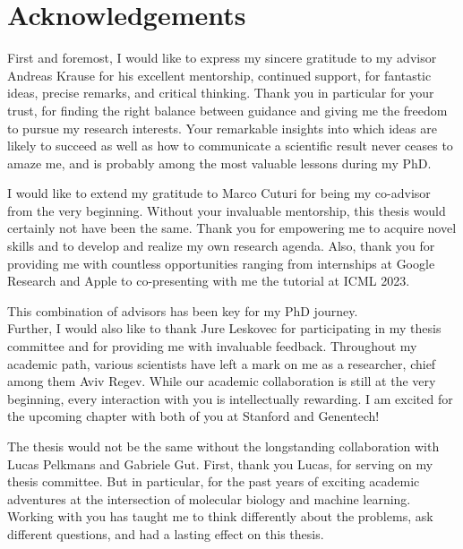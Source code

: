 
\bigskip

\begingroup
\let\clearpage\relax
\let\cleardoublepage\relax
\let\cleardoublepage\relax
\chapter*{Acknowledgements}

\def\thanks#1{%
\begingroup
\leftskip1em
\noindent #1
\par
\endgroup
}

First and foremost, I would like to express my sincere gratitude to my advisor Andreas Krause for his excellent mentorship, continued support, for fantastic ideas, precise remarks, and critical thinking.
Thank you in particular for your trust, for finding the right balance between guidance and giving me the freedom to pursue my research interests.
Your remarkable insights into which ideas are likely to succeed as well as how to communicate a scientific result never ceases to amaze me, and is probably among the most valuable lessons during my PhD.

I would like to extend my gratitude to Marco Cuturi for being my co-advisor from the very beginning. 
Without your invaluable mentorship, this thesis would certainly not have been the same. Thank you for empowering me to acquire novel skills and to develop and realize my own research agenda.
Also, thank you for providing me with countless opportunities ranging from internships at Google Research and Apple to co-presenting with me the tutorial at ICML 2023.

This combination of advisors has been key for my PhD journey. \\

Further, I would also like to thank Jure Leskovec for participating in my thesis committee and for providing me with invaluable feedback. 
Throughout my academic path, various scientists have left a mark on me as a researcher, chief among them Aviv Regev. While our academic collaboration is still at the very beginning, every interaction with you is intellectually rewarding.
I am excited for the upcoming chapter with both of you at Stanford and Genentech!

 The thesis would not be the same without the longstanding collaboration with Lucas Pelkmans and Gabriele Gut. First, thank you Lucas, for serving on my thesis committee.
But in particular, for the past years of exciting academic adventures at the intersection of molecular biology and machine learning. Working with you has taught me to think differently about the problems, ask different questions, and had a lasting effect on this thesis.

